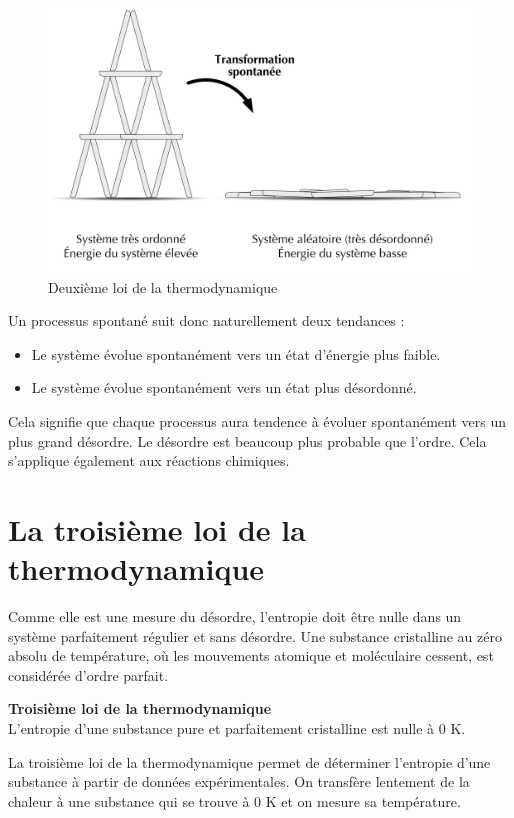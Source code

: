 \documentclass[
  11pt,
  a4paper,
  openany]{book}
\providecommand{\tightlist}{%
  \setlength{\itemsep}{0pt}\setlength{\parskip}{0pt}}
\begin{document}
\clearpage

\begin{figure}

{\centering \includegraphics[width=0.4\linewidth]{images/cards-castle} 

}

\caption{Deuxième loi de la thermodynamique}\label{fig:cards-castle}
\end{figure}

Un processus spontané suit donc naturellement deux tendances :

\begin{itemize}
\tightlist
\item
  Le système évolue spontanément vers un état d'énergie plus faible.
\item
  Le système évolue spontanément vers un état plus désordonné.
\end{itemize}

Cela signifie que chaque processus aura tendence à évoluer spontanément vers un plus grand désordre. Le désordre est beaucoup plus probable que l'ordre. Cela s'applique également aux réactions chimiques.

\section{La troisième loi de la thermodynamique}\label{la-troisiuxe8me-loi-de-la-thermodynamique}

Comme elle est une mesure du désordre, l'entropie doit être nulle dans un système parfaitement régulier et sans désordre. Une substance cristalline au zéro absolu de température, où les mouvements atomique et moléculaire cessent, est considérée d'ordre parfait.

\begin{tcolorbox}
\textbf{Troisième loi de la thermodynamique}\\
L'entropie d'une substance pure et parfaitement cristalline est nulle à 0 K.

\end{tcolorbox}

La troisième loi de la thermodynamique permet de déterminer l'entropie d'une substance à partir de données expérimentales. On transfère lentement de la chaleur à une substance qui se trouve à 0 K et on mesure sa température.
\end{document}
